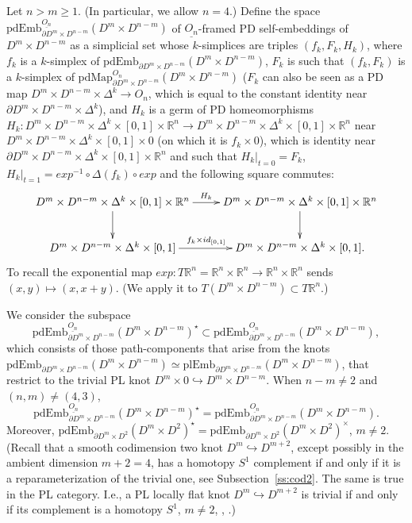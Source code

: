 \documentclass[11pt]{amsart}
\theoremstyle{definition}
\newcommand{\R}{{\mathbb R}}
\newcommand{\plEmb}{\mathrm{plEmb}}
\newcommand{\pdEmb}{\mathrm{pdEmb}}
\newcommand{\pdMap}{\mathrm{pdMap}}
\numberwithin{equation}{section}
\begin{document}
Let $n>m\geq 1$. (In particular, we allow $n=4$.) Define the space $\pdEmb_{\partial D^m\times D^{n-m}}^{\underline{O_n}}(D^m\times
D^{n-m})$ of $\underline{O_n}$-framed PD self-embeddings of $D^m\times D^{n-m}$ as a simplicial set whose $k$-simplices
are triples $(f_k,F_k,H_k)$, where $f_k$ is a $k$-simplex of $\pdEmb_{\partial D^m\times D^{n-m}}(D^m\times
D^{n-m})$, $F_k$ is such that $(f_k,F_k)$ is a $k$-simplex of $\pdMap_{\partial D^m\times D^{n-m}}^{O_n}(D^m\times
D^{n-m})$ ($F_k$ can also be seen as a PD map $D^m\times D^{n-m}\times \Delta^k\to O_n$, which is equal to the constant identity near $\partial D^m\times D^{n-m}\times \Delta^k$), and $H_k$ is a germ of PD homeomorphisms $H_k\colon D^m\times D^{n-m}\times \Delta^k\times [0,1]\times \R^n
\to D^m\times D^{n-m}\times \Delta^k\times [0,1]\times \R^n$ near $D^m\times D^{n-m}\times \Delta^k\times [0,1]\times 0$ (on which it is  $f_k\times 0$), which is identity near 
$\partial D^m\times D^{n-m}\times \Delta^k\times [0,1]\times \R^n$ and such that $H_k|_{t=0}=F_k$, $H_k|_{t=1}=exp^{-1}\circ \Delta(f_k)\circ exp$ and the following square commutes:
\[
\xymatrix{
D^m\times D^{n-m}\times\Delta^k\times [0,1]\times\R^n\ar[r]^-{H_k}\ar[d]&D^m\times D^{n-m}\times\Delta^k\times [0,1]\times\R^n\ar[d]\\
D^m\times D^{n-m}\times\Delta^k\times [0,1]\ar[r]^{f_k\times id_{[0,1]}}&D^m\times D^{n-m}\times\Delta^k\times [0,1].
}
\]
To recall the exponential map $exp\colon T\R^n=\R^n\times\R^n\to\R^n\times\R^n$ sends $(x,y)\mapsto (x,x+y)$. (We apply it to $T\left(D^m\times D^{n-m}\right)\subset T\R^n$.)

We consider the subspace 
$$
\pdEmb_{\partial D^m\times D^{n-m}}^{\underline{O_n}}(D^m\times
D^{n-m})^\star \subset\pdEmb_{\partial D^m\times D^{n-m}}^{\underline{O_n}}(D^m\times
D^{n-m}),
$$
 which consists of those path-components that arise from the knots
 $
\pdEmb_{\partial D^m\times D^{n-m}}(D^m\times
D^{n-m})\simeq \plEmb_{\partial D^m\times D^{n-m}}(D^m\times
D^{n-m})$, that restrict to the trivial PL knot $D^m\times 0\hookrightarrow D^m\times D^{n-m}$. When $n-m\neq 2$ and $(n,m)\neq (4,3)$,
$$
\pdEmb_{\partial D^m\times D^{n-m}}^{\underline{O_n}}(D^m\times
D^{n-m})^\star =\pdEmb_{\partial D^m\times D^{n-m}}^{\underline{O_n}}(D^m\times
D^{n-m}).
$$
Moreover, $\pdEmb_{\partial D^m\times D^{2}}(D^m\times D^{2})^\star=\pdEmb_{\partial D^m\times D^{2}}(D^m\times D^{2})^\times$, $m\neq 2$. (Recall that
a smooth codimension two knot $D^m\hookrightarrow D^{m+2}$, except possibly in the ambient dimension $m+2=4$,  has a homotopy $S^1$ complement if and only if it is a reparameterization of the trivial one, see Subsection~\ref{ss:cod2}. The same is true in the PL category. I.e., a PL locally flat knot $D^m\hookrightarrow D^{m+2}$ is trivial if and only if its complement is a homotopy $S^1$, $m\neq 2$, \cite{Levine,Papa,Shane,Wall_spheres,Wall_surgery}, \cite[Theorem~1]{Wall_codim2}.)   
\end{document}
